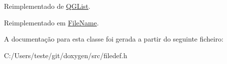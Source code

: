 Reimplementado de \hyperlink{class_q_g_list_aac689c6d7a54b6558afbd53845183af8}{Q\-G\-List}.



Reimplementado em \hyperlink{class_file_name_a219450accf048597ffc7113ecde4c402}{File\-Name}.



A documentação para esta classe foi gerada a partir do seguinte ficheiro\-:\begin{DoxyCompactItemize}
\item 
C\-:/\-Users/teste/git/doxygen/src/filedef.\-h\end{DoxyCompactItemize}
